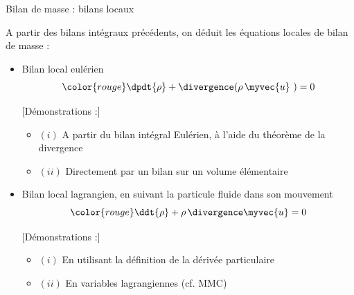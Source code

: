 \begin{frame}{Bilan de masse : bilans locaux}

\small

A partir des bilans intégraux précédents, on déduit les équations locales de bilan de masse :

\medskip

\begin{itemize}

\item
  Bilan local eulérien
	\begin{equation}
			\color{rouge}
		\dpdt{\rho} + \divergence ( \rho \, \myvec{u}\ ) = 0
		\label{eq:bilan_local_eulerien_masse}
	\end{equation}
\medskip

\pause 
\textcolor{gris}{[Démonstrations :]}

\begin{itemize}
	\item $(i)$ A partir du bilan intégral Eulérien, à l'aide du théorème de la divergence
	\item $(ii)$ Directement par un bilan sur un volume élémentaire 
\end{itemize}


\pause

\item
	Bilan local lagrangien, en suivant la particule fluide dans son mouvement
	\begin{equation}
		\color{rouge}
		\ddt{\rho} + \rho \, \divergence \myvec{u} = 0
		\label{eq:bilan_local_lagrangien_masse}
	\end{equation}
\pause

\textcolor{gris}{[Démonstrations :] }
\begin{itemize}
	\item $(i)$ En utilisant la définition de la dérivée particulaire
	\item $(ii)$ En variables lagrangiennes (cf. MMC) 
\end{itemize}


\end{itemize}
\end{frame}

